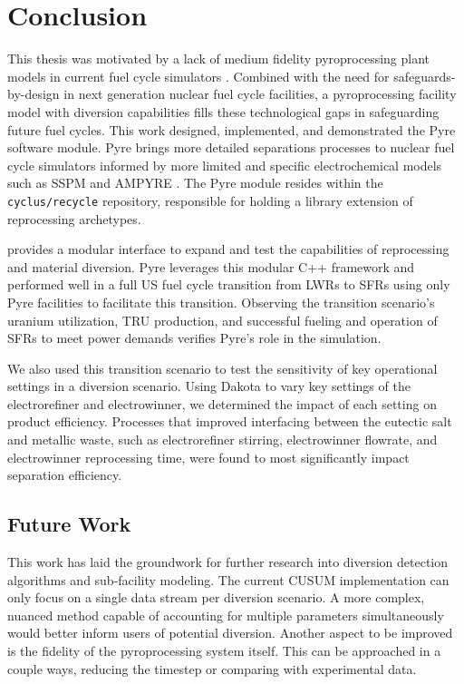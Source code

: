 \chapter{Conclusion}

This thesis was motivated by a lack of medium fidelity pyroprocessing plant models in current fuel cycle simulators \cite{borrelli_approaches_2017}. Combined with 
the need for safeguards-by-design in next generation nuclear fuel cycle facilities, a pyroprocessing facility model with diversion capabilities fills these technological gaps in safeguarding future fuel cycles.
This work designed, implemented, and demonstrated the Pyre software module.
Pyre brings more detailed separations processes to nuclear fuel cycle simulators informed by more limited and specific electrochemical models such as SSPM and AMPYRE \cite{maggos_update_2015,cipiti_modeling_2012}. The Pyre module resides within the \texttt{cyclus/recycle} repository, responsible for holding a library extension of reprocessing archetypes.

\Cyclus provides a modular interface to expand and test the capabilities of reprocessing and material diversion. Pyre leverages this
modular C++ framework and performed well in a full US fuel cycle transition from LWRs to SFRs using only Pyre facilities to facilitate
this transition. 
Observing the transition scenario's uranium utilization, TRU production, and successful fueling and operation of SFRs to
meet power demands verifies Pyre's role in the simulation.

We also used this transition scenario to test the sensitivity of key operational settings in a diversion scenario. Using Dakota to vary key settings of the electrorefiner and electrowinner, we
determined the impact of each setting on product efficiency. Processes that improved interfacing between the eutectic salt and metallic waste, such as electrorefiner stirring, electrowinner flowrate, and electrowinner reprocessing time, 
were found to most significantly impact separation efficiency. 

\newpage

\section{Future Work}

This work has laid the groundwork for further research into diversion detection algorithms and sub-facility modeling. The current CUSUM implementation can only focus on a single data stream per diversion scenario.
A more complex, nuanced method capable of accounting for multiple parameters simultaneously would better inform users of potential diversion. 
Another aspect to be improved is the fidelity of the pyroprocessing system itself. 
This can be approached in a couple ways, reducing the timestep or comparing with experimental data. 

